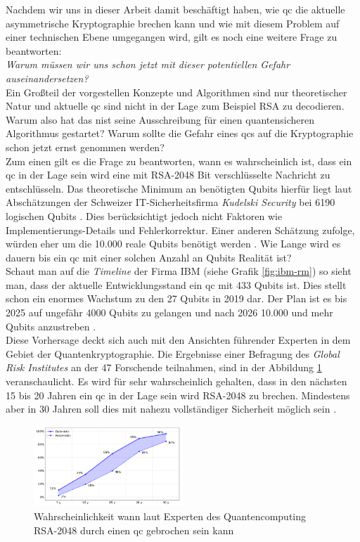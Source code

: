 Nachdem wir uns in dieser Arbeit damit beschäftigt haben, wie \ac{qc} die aktuelle asymmetrische Kryptographie brechen kann und wie mit diesem Problem auf einer technischen Ebene umgegangen wird, gilt es noch eine weitere Frage zu beantworten: \\
\textit{Warum müssen wir uns schon jetzt mit dieser potentiellen Gefahr auseinandersetzen?}\\
Ein Großteil der vorgestellen Konzepte und Algorithmen sind nur theoretischer Natur und aktuelle \ac{qc} sind nicht in der Lage zum Beispiel RSA zu decodieren. Warum also hat das \ac{nist} seine Ausschreibung für einen quantensicheren Algorithmus gestartet? Warum sollte die Gefahr eines \ac{qc}s auf die Kryptographie schon jetzt ernst genommen werden?\\
Zum einen gilt es die Frage zu beantworten, wann es wahrscheinlich ist, dass ein \ac{qc} in der Lage sein wird eine mit RSA-2048 Bit verschlüsselte Nachricht zu entschlüsseln. Das theoretische Minimum an benötigten Qubits hierfür liegt laut Abschätzungen der Schweizer IT-Sicherheitsfirma \textit{Kudelski Security} bei 6190 logischen Qubits \cite{gagliardoni_quantum_2021}. Dies berücksichtigt jedoch nicht Faktoren wie Implementierungs-Details und Fehlerkorrektur. Einer anderen Schätzung zufolge, würden eher um die 10.000 reale Qubits benötigt werden \cite{ziegler_online_2015}. Wie Lange wird es dauern bis ein \ac{qc} mit einer solchen Anzahl an Qubits Realität ist?\\
Schaut man auf die \textit{Timeline} der Firma IBM (siehe Grafik \ref{fig:ibm-rm}) so sieht man, dass der aktuelle Entwicklungsstand ein \ac{qc} mit 433 Qubits ist. Dies stellt schon ein enormes Wachstum zu den 27 Qubits in 2019 dar. Der Plan ist es bis 2025 auf ungefähr 4000 Qubits zu gelangen und nach 2026 10.000 und mehr Qubits anzustreben \cite{noauthor_ibm_2015}.\\
Diese Vorhersage deckt sich auch mit den Ansichten führender Experten in dem Gebiet der Quantenkryptographie. Die Ergebnisse einer Befragung des \textit{Global Risk Institutes} an der 47 Forschende teilnahmen, sind in der Abbildung \ref{fig:qx-approx} veranschaulicht. Es wird für sehr wahrscheinlich gehalten, dass in den nächsten 15 bis 20 Jahren ein \ac{qc} in der Lage sein wird RSA-2048 zu brechen. Mindestens aber in 30 Jahren soll dies mit nahezu vollständiger Sicherheit möglich sein \cite{noauthor_2021_nodate}.

\begin{figure}[!hbt]
    \centering
    \includegraphics[width=0.5\textwidth]{images/estiamte-qc.png}
    \caption{Wahrscheinlichkeit wann laut Experten des Quantencomputing RSA-2048 durch einen \ac{qc} gebrochen sein kann \cite{noauthor_2021_nodate}}
    \label{fig:qx-approx}
\end{figure}

